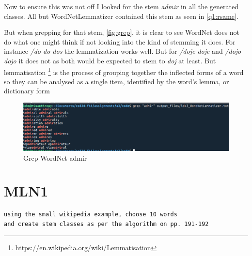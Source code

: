 \documentclass[11pt]{article}
\newenvironment{code}{\captionsetup{type=listing}}{}
\begin{document}

Now to ensure this was not off I looked for the stem \textit{admir} in all the generated classes. All but WordNetLemmatizer contained this stem as seen in \autoref{q1:rsame}.

But when grepping for that stem, \autoref{fig:grep}, it is clear to see WordNet does not do what one might think if not looking into the kind of stemming it does. For instance \textit{/do do dos} the lemmatization works well. But for \textit{/doje doje} and \textit{/dojo dojo} it does not as both would be expected to stem to \textit{doj} at least. But lemmatisation \footnote{https://en.wikipedia.org/wiki/Lemmatisation} is the process of grouping together the inflected forms of a word so they can be analysed as a single item, identified by the word's lemma, or dictionary form  
\begin{figure}[H]
\centering
\includegraphics[scale=0.5]{grepOutput.png}
\caption{Grep WordNet admir}
\label{fig:grep}
\end{figure}
\newpage
\begin{code}
 \label{code:idxr}
\end{code}
\begin{code}
\label{code:scd}
\end{code}
\newpage
\section{MLN1}
\begin{verbatim}
using the small wikipedia example, choose 10 words 
and create stem classes as per the algorithm on pp. 191-192
\end{verbatim}
\end{document}
